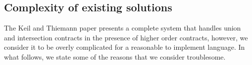 
\subsection{Complexity of existing solutions}

The Keil and Thiemann paper presents a complete system that handles union and intersection
contracts in the presence of higher order contracts, however, we consider it to be overly
complicated for a reasonable to implement language.
In what follows, we state some of the reasons that we consider troublesome.










